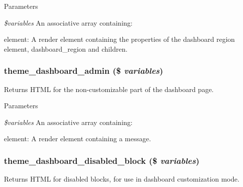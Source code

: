 \begin{DoxyParams}{Parameters}
\item[{\em \$variables}]An associative array containing:
\begin{DoxyItemize}
\item element: A render element containing the properties of the dashboard region element, dashboard\_\-region and children. 
\end{DoxyItemize}\end{DoxyParams}
\hypertarget{group__themeable_gaa23f321cda9a9681189b56dde889c5be}{
\subsubsection[{theme\_\-dashboard\_\-admin}]{\setlength{\rightskip}{0pt plus 5cm}theme\_\-dashboard\_\-admin (\$ {\em variables})}}
\label{group__themeable_gaa23f321cda9a9681189b56dde889c5be}
Returns HTML for the non-\/customizable part of the dashboard page.


\begin{DoxyParams}{Parameters}
\item[{\em \$variables}]An associative array containing:
\begin{DoxyItemize}
\item element: A render element containing a message. 
\end{DoxyItemize}\end{DoxyParams}
\hypertarget{group__themeable_ga4a956aaf4c079a8d60542ed1ad9f3b9e}{
\subsubsection[{theme\_\-dashboard\_\-disabled\_\-block}]{\setlength{\rightskip}{0pt plus 5cm}theme\_\-dashboard\_\-disabled\_\-block (\$ {\em variables})}}
\label{group__themeable_ga4a956aaf4c079a8d60542ed1ad9f3b9e}
Returns HTML for disabled blocks, for use in dashboard customization mode.



